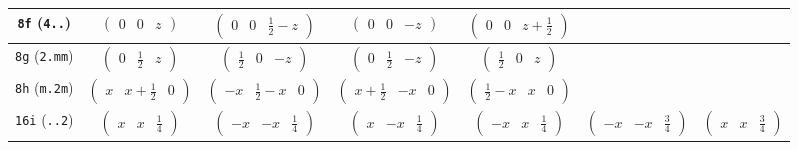 \documentclass[fleqn,9pt,landscape]{jsarticle}
\begin{document}
\begin{center}
\begin{longtable}{ccccccc}
{\tt 8f} ({\tt 4..}) & $ \begin{pmatrix} 0 & 0 & z \end{pmatrix} $ & $ \begin{pmatrix} 0 & 0 & \frac{1}{2} - z \end{pmatrix} $ & $ \begin{pmatrix} 0 & 0 & - z \end{pmatrix} $ & $ \begin{pmatrix} 0 & 0 & z + \frac{1}{2} \end{pmatrix} $ & $  $ & $  $ \\ \hline
{\tt 8g} ({\tt 2.mm}) & $ \begin{pmatrix} 0 & \frac{1}{2} & z \end{pmatrix} $ & $ \begin{pmatrix} \frac{1}{2} & 0 & - z \end{pmatrix} $ & $ \begin{pmatrix} 0 & \frac{1}{2} & - z \end{pmatrix} $ & $ \begin{pmatrix} \frac{1}{2} & 0 & z \end{pmatrix} $ & $  $ & $  $ \\ \hline
{\tt 8h} ({\tt m.2m}) & $ \begin{pmatrix} x & x + \frac{1}{2} & 0 \end{pmatrix} $ & $ \begin{pmatrix} - x & \frac{1}{2} - x & 0 \end{pmatrix} $ & $ \begin{pmatrix} x + \frac{1}{2} & - x & 0 \end{pmatrix} $ & $ \begin{pmatrix} \frac{1}{2} - x & x & 0 \end{pmatrix} $ & $  $ & $  $ \\ \hline
{\tt 16i} ({\tt ..2}) & $ \begin{pmatrix} x & x & \frac{1}{4} \end{pmatrix} $ & $ \begin{pmatrix} - x & - x & \frac{1}{4} \end{pmatrix} $ & $ \begin{pmatrix} x & - x & \frac{1}{4} \end{pmatrix} $ & $ \begin{pmatrix} - x & x & \frac{1}{4} \end{pmatrix} $ & $ \begin{pmatrix} - x & - x & \frac{3}{4} \end{pmatrix} $ & $ \begin{pmatrix} x & x & \frac{3}{4} \end{pmatrix} $ \\

\end{longtable}
\end{center}
\end{document}
